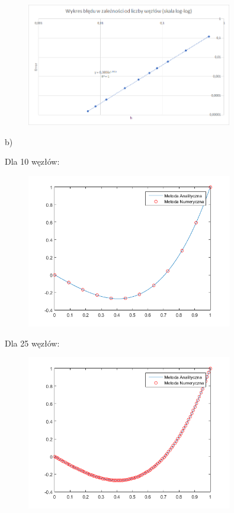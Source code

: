 \begin{figure}[!ht]
	\begin{center}
		\includegraphics[width=0.8\textwidth]{Lab3/charts/zad1/error.png}
	\end{center}
\end{figure}

\newpage

b)

Dla 10 węzłów:

\begin{figure}[!ht]
	\begin{center}
		\includegraphics[width=0.8\textwidth]{Lab3/charts/zad2/10.png}
	\end{center}
\end{figure}

Dla 25 węzłów:

\begin{figure}[!ht]
	\begin{center}
		\includegraphics[width=0.8\textwidth]{Lab3/charts/zad2/25.png}
	\end{center}
\end{figure}

